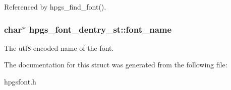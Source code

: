 Referenced by hpgs\_\-find\_\-font().

\subsubsection[{font\_\-name}]{\setlength{\rightskip}{0pt plus 5cm}char$\ast$ {\bf hpgs\_\-font\_\-dentry\_\-st::font\_\-name}}\label{structhpgs__font__dentry__st_abbc203a7f4c4145107e1eb90f6f8a83c}
The utf8-\/encoded name of the font. 

The documentation for this struct was generated from the following file:\begin{DoxyCompactItemize}
\item 
hpgsfont.h\end{DoxyCompactItemize}
